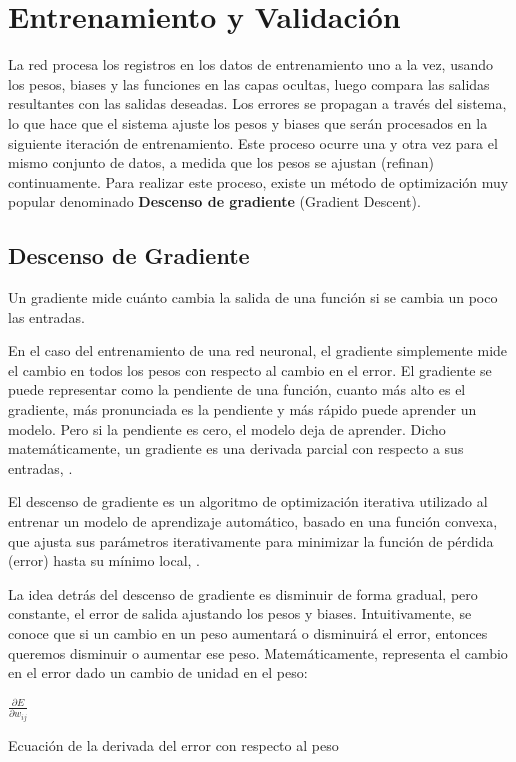 \newpage
\section{Entrenamiento y Validación}

	La red procesa los registros en los datos de entrenamiento uno a la vez, usando los pesos, biases y las funciones en las capas ocultas, luego compara las salidas resultantes con las salidas deseadas. Los errores se propagan a través del sistema, lo que hace que el sistema ajuste los pesos y biases que serán procesados en la siguiente iteración de entrenamiento. Este proceso ocurre una y otra vez para el mismo conjunto de datos, a medida que los pesos se ajustan (refinan) continuamente. Para realizar este proceso, existe un método de optimización muy popular denominado {\bf Descenso de gradiente} (Gradient Descent).

	\subsection{Descenso de Gradiente}

		Un gradiente mide cuánto cambia la salida de una función si se cambia un poco las entradas.

		En el caso del entrenamiento de una red neuronal, el gradiente simplemente mide el cambio en todos los pesos con respecto al cambio en el error. El gradiente se puede representar como la pendiente de una función, cuanto más alto es el gradiente, más pronunciada es la pendiente y más rápido puede aprender un modelo. Pero si la pendiente es cero, el modelo deja de aprender. Dicho matemáticamente, un gradiente es una derivada parcial con respecto a sus entradas, \citep{gradient}.

		El descenso de gradiente es un algoritmo de optimización iterativa utilizado al entrenar un modelo de aprendizaje automático, basado en una función convexa, que ajusta sus parámetros iterativamente para minimizar la función de pérdida (error) hasta su mínimo local, \citep{gradient}.

		La idea detrás del descenso de gradiente es disminuir de forma gradual, pero constante, el error de salida ajustando los pesos y biases. Intuitivamente, se conoce que si un cambio en un peso aumentará o disminuirá el error, entonces queremos disminuir o aumentar ese peso. Matemáticamente, representa el cambio en el error dado un cambio de unidad en el peso:

		\begingroup\makeatletter{}\check@mathfonts
		\begin{center}
		$ \frac{{\partial E}}{\partial w_{ij}}$
		\end{center}
		\begin{center}
		{\small{Ecuación de la derivada del error con respecto al peso}}
		\end{center}
		\endgroup
		
